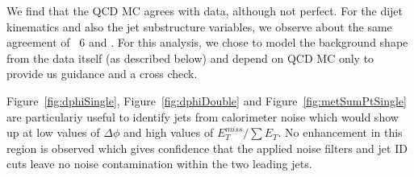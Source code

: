 \newpage


We find that the QCD MC agrees with data, although not perfect.
For the dijet kinematics and also the jet substructure variables, we observe about the same agreement of \PYTHIA~6 and \HERWIG{++}. 
For this analysis, we chose to model the background shape from the data itself
(as described below)
and depend on QCD MC only to provide us guidance and a cross check.

Figure~\ref{fig:dphiSingle}, Figure~\ref{fig:dphiDouble} and Figure~\ref{fig:metSumPtSingle} are particulariy useful to identify jets from calorimeter noise which would show up at low values of $\Delta\phi$ and high values of $E_{T}^{miss}/\sum E_{T}$. No enhancement in this region is observed which gives confidence that the applied noise filters and jet ID cuts leave no noise contamination within the two leading jets.




